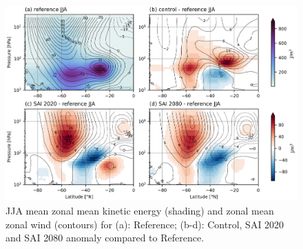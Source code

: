 \begin{figure}[H]
	\centering
	\includegraphics[width=0.95\linewidth]{images/KE_U_zmdiff_JJA.png}
	\caption{JJA mean zonal mean kinetic energy (shading) and zonal mean zonal wind (contours) for (a): Reference; (b-d): Control, SAI 2020 and SAI 2080 anomaly compared to Reference.}
	\label{fig:KE_U_zmdiff_JJA}
\end{figure}